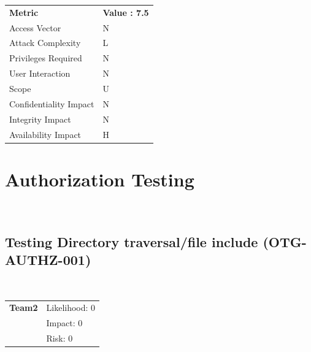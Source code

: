 \documentclass[headsepline,footsepline,footinclude=false,oneside,fontsize=11pt,paper=a4,listof=totoc,bibliography=totoc]{scrbook} %
\begin{document}
\begin{center}
	\begin{tabular}{ll}
		\rowcolor[HTML]{34CDF9}
		{\color[HTML]{ECF4FF} \textbf{Metric}}        & {\color[HTML]{ECF4FF} \textbf{Value : 7.5 }} \\
		\rowcolor[HTML]{BBDAFF}
		{\color[HTML]{333333} Access Vector}          & {\color[HTML]{333333} } N              \\
		\rowcolor[HTML]{ECF4FF}
		{\color[HTML]{333333} Attack Complexity}      & {\color[HTML]{333333} } L              \\
		\rowcolor[HTML]{BBDAFF}
		{\color[HTML]{333333} Privileges Required}    & {\color[HTML]{333333} } N              \\
		\rowcolor[HTML]{ECF4FF}
		{\color[HTML]{333333} User Interaction}       & {\color[HTML]{333333} } N              \\
		\rowcolor[HTML]{BBDAFF}
		{\color[HTML]{333333} Scope}                  & {\color[HTML]{333333} } U              \\
		\rowcolor[HTML]{ECF4FF}
		{\color[HTML]{333333} Confidentiality Impact} & {\color[HTML]{333333} } N              \\
		\rowcolor[HTML]{BBDAFF}
		{\color[HTML]{333333} Integrity Impact}       & {\color[HTML]{333333} } N              \\
		\rowcolor[HTML]{ECF4FF}
		{\color[HTML]{333333} Availability Impact}    & {\color[HTML]{333333} } H
	\end{tabular}
\end{center}

\pagebreak
\section{Authorization Testing}\
\subsection{Testing Directory traversal/file include (OTG-AUTHZ-001)}\

\begin{tabular}{cR{12cm}}
	\textbf{Team2} & Likelihood: 0\\& Impact: 0\\& Risk: 0 
\end{tabular}
\end{document}
